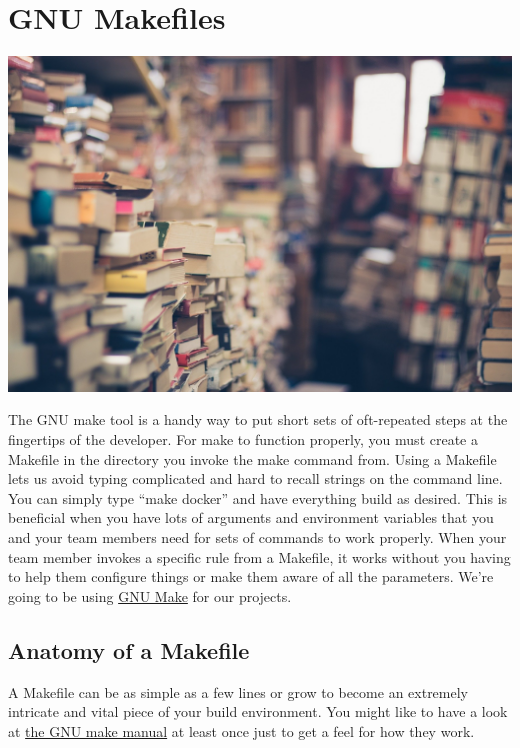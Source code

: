 \chapter{GNU Makefiles}

\includegraphics[scale=0.20]{images/books-1163695_1920.jpg}

\justify{}
The GNU make tool is a handy way to put short sets of oft-repeated steps at the fingertips of the
developer. For make to function properly, you must create a Makefile in the directory
you invoke the make command from. Using a Makefile lets us avoid typing complicated and hard to recall strings on the command
line. You can simply type ``make docker'' and have everything build as desired. This is beneficial when
you have lots of arguments and environment variables that you and your team members need for sets of commands
to work properly. When your team member invokes a specific rule from a Makefile, it works without you having to 
help them configure things or make them aware of all the parameters.
We're going to be using \href{https://www.gnu.org/software/make/}{GNU Make} for our projects.

\section{Anatomy of a Makefile}

\justify{}
A Makefile can be as simple as a few lines or grow to become an extremely intricate and vital piece of your
build environment. You might like to have a look at 
\href{https://www.gnu.org/software/make/manual/make.html#Introduction}{the GNU make manual} at least once just to get a feel for how they work.

